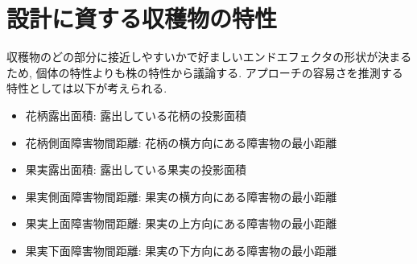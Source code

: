 \section{設計に資する収穫物の特性}
収穫物のどの部分に接近しやすいかで好ましいエンドエフェクタの形状が決まるため, 個体の特性よりも株の特性から議論する.
アプローチの容易さを推測する特性としては以下が考えられる.

\begin{itemize}
  \item 花柄露出面積: 露出している花柄の投影面積
  \item 花柄側面障害物間距離: 花柄の横方向にある障害物の最小距離
  \item 果実露出面積: 露出している果実の投影面積
  \item 果実側面障害物間距離: 果実の横方向にある障害物の最小距離
  \item 果実上面障害物間距離: 果実の上方向にある障害物の最小距離
  \item 果実下面障害物間距離: 果実の下方向にある障害物の最小距離
\end{itemize}


